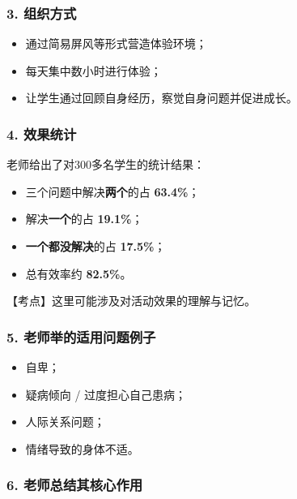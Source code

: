\documentclass[
  chinese,
  9pt,
  a4paper,
]{ctexart}
\providecommand{\tightlist}{%
  \setlength{\itemsep}{0pt}\setlength{\parskip}{0pt}}
\begin{document}
\subsubsection{3. 组织方式}\label{ux7ec4ux7ec7ux65b9ux5f0f}

\begin{itemize}
\tightlist
\item
  通过简易屏风等形式营造体验环境；
\item
  每天集中数小时进行体验；
\item
  让学生通过回顾自身经历，察觉自身问题并促进成长。
\end{itemize}

\subsubsection{4. 效果统计}\label{ux6548ux679cux7edfux8ba1}

老师给出了对300多名学生的统计结果：

\begin{itemize}
\tightlist
\item
  三个问题中解决\textbf{两个}的占 \textbf{63.4\%}；
\item
  解决\textbf{一个}的占 \textbf{19.1\%}；
\item
  \textbf{一个都没解决}的占 \textbf{17.5\%}；
\item
  总有效率约 \textbf{82.5\%}。
\end{itemize}

【考点】这里可能涉及对活动效果的理解与记忆。

\subsubsection{5.
老师举的适用问题例子}\label{ux8001ux5e08ux4e3eux7684ux9002ux7528ux95eeux9898ux4f8bux5b50}

\begin{itemize}
\tightlist
\item
  自卑；
\item
  疑病倾向 / 过度担心自己患病；
\item
  人际关系问题；
\item
  情绪导致的身体不适。
\end{itemize}

\subsubsection{6.
老师总结其核心作用}\label{ux8001ux5e08ux603bux7ed3ux5176ux6838ux5fc3ux4f5cux7528}
\end{document}
